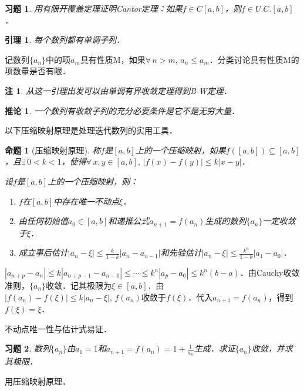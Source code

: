 \documentclass[11pt,a4paper]{ctexart}
\makeatletter
\theoremstyle{thmseries} %
\newtheorem{cor}{推论}[section]
\newtheorem{prop}{命题}[section]
\newtheorem{lem}{引理}[section]
\theoremstyle{exerseries}
\newtheorem{exer}{习题}[section]
\newtheorem*{rem}{注}
\renewenvironment{proof}[1][\proofname]{\par
  \pushQED{\qed}%
  \normalfont \topsep6\p@\@plus6\p@\relax
  \trivlist
  \item[\hskip\labelsep
        \itshape
    #1\@addpunct{}]\ignorespaces
}{%
  \popQED\endtrivlist\@endpefalse
}
\newenvironment{pf}{\begin{proof}[\bfseries\upshape 证\quad]}{\end{proof}}
\newcommand{\bra}[1]{\mathopen{}\left(#1\right)}
\makeatother
\begin{document}
\begin{exer}
	用有限开覆盖定理证明Cantor定理：如果$f\in C[a,b]$，则$f\in U.C.[a,b]$．
\end{exer}

\begin{lem}
	每个数列都有单调子列．
\end{lem}
\begin{pf}
	记数列$\{a_n\}$中的项$a_m$具有性质M，如果$\forall\,n>m,\,a_n\leq a_m$．分类讨论具有性质M的项数量是否有限．
\end{pf}
\begin{rem}
	从这一引理出发可以由单调有界收敛定理得到B-W定理．
\end{rem}

\begin{cor}
	一个数列有收敛子列的充分必要条件是它不是无穷大量．
\end{cor}

以下压缩映射原理是处理迭代数列的实用工具．
\begin{prop}[压缩映射原理]
	称$f$是$[a,b]$上的一个压缩映射，如果$f\bra{[a,b]}\subseteq[a,b]$，且$\exists\,0<k<1$，使得$\forall\,x,y\in[a,b],\,|f(x)-f(y)|\leq k|x-y|$．

	设$f$是$[a,b]$上的一个压缩映射，则：
	\begin{enumerate}
		\item $f$在$[a,b]$中存在唯一不动点$\xi$．
		\item 由任何初始值$a_0\in[a,b]$和递推公式$a_{n+1}=f(a_n)$生成的数列$\{a_n\}$一定收敛于$\xi$．
		\item 成立事后估计$|a_n-\xi|\leq\frac{k}{1-k}|a_n-a_{n-1}|$和先验估计$|a_n-\xi|\leq\frac{k^n}{1-k}|a_1-a_0|$．
	\end{enumerate}
\end{prop}
\begin{pf}
	$|a_{n+p}-a_n|\leq k|a_{n+p-1}-a_{n-1}|\leq\cdots\leq k^n|a_p-a_0|\leq k^n(b-a)$．由Cauchy收敛准则，$\{a_n\}$收敛．记其极限为$\xi\in[a,b]$．由$|f(a_n)-f(\xi)|\leq k|a_n-\xi|,\,f(a_n)$收敛于$f(\xi)$．代入$a_{n+1}=f(a_n)$，得到$f(\xi)=\xi$．

	不动点唯一性与估计式易证．
\end{pf}

\begin{exer}
	数列$\{a_n\}$由$a_1=1$和$a_{n+1}=f(a_n)=1+\frac{1}{a_n}$生成．求证$\{a_n\}$收敛，并求其极限．
\end{exer}
\begin{pf}
	用压缩映射原理．
\end{pf}
\end{document}
